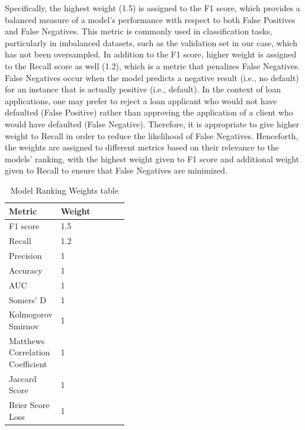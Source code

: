 Specifically, the highest weight (1.5) is assigned to the F1 score, which provides a balanced measure of a model's performance with respect to both False Positives and False Negatives.
This metric is commonly used in classification tasks, particularly in imbalanced datasets, such as the validation set in our case, which has not been oversampled.
In addition to the F1 score, higher weight is assigned to the Recall score as well (1.2), which is a metric that penalizes False Negatives.
False Negatives occur when the model predicts a negative result (i.e., no default) for an instance that is actually positive (i.e., default).
In the context of loan applications, one may prefer to reject a loan applicant who would not have defaulted (False Positive) rather than approving the application of a client who would have defaulted (False Negative). Therefore, it is appropriate to give higher weight to Recall in order to reduce the likelihood of False Negatives.
Henceforth, the weights are assigned to different metrics based on their relevance to the models' ranking, with the highest weight given to F1 score and additional weight given to Recall to ensure that False Negatives are minimized.

\begin{table}[H]
\small
\setlength{\tabcolsep}{8pt}
\renewcommand{\arraystretch}{1.3}
\centering
    \caption[Model Ranking Weights table]{Model Ranking Weights table}\label{tab:weightsrank}
    \begin{tabular}{>{\raggedleft\arraybackslash}p{0.4\linewidth} l}
\toprule
\textbf{Metric} & \textbf{Weight}\\
\midrule
\hline
F1 score & 1.5 \\
Recall & 1.2 \\
Precision & 1 \\
Accuracy & 1 \\
AUC & 1 \\
Somers' D & 1 \\ 
Kolmogorov Smirnov & 1 \\
Matthews Correlation Coefficient  & 1 \\
Jaccard Score  & 1 \\
Brier Score Loss  & 1 \\
\hline
\bottomrule
\end{tabular}
\vspace{0.7em}

\vspace{-1em}
\end{table}

